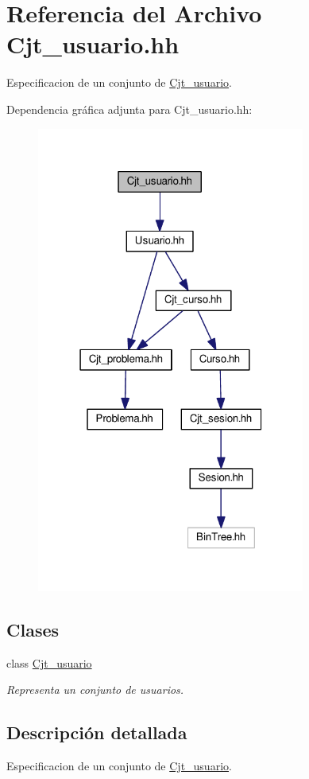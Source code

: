 \hypertarget{_cjt__usuario_8hh}{}\section{Referencia del Archivo Cjt\+\_\+usuario.\+hh}
\label{_cjt__usuario_8hh}


Especificacion de un conjunto de \mbox{\hyperlink{class_cjt__usuario}{Cjt\+\_\+usuario}}.  


Dependencia gráfica adjunta para Cjt\+\_\+usuario.\+hh\+:
\nopagebreak
\begin{figure}[H]
\begin{center}
\leavevmode
\includegraphics[width=250pt]{_cjt__usuario_8hh__incl}
\end{center}
\end{figure}
\subsection*{Clases}
\begin{DoxyCompactItemize}
\item 
class \mbox{\hyperlink{class_cjt__usuario}{Cjt\+\_\+usuario}}
\begin{DoxyCompactList}\small\item\em Representa un conjunto de usuarios. \end{DoxyCompactList}\end{DoxyCompactItemize}


\subsection{Descripción detallada}
Especificacion de un conjunto de \mbox{\hyperlink{class_cjt__usuario}{Cjt\+\_\+usuario}}. 

